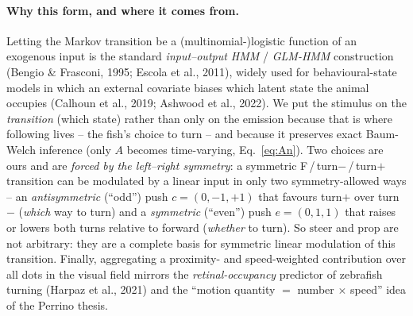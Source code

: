 \documentclass[11pt]{article}
\begin{document}
\paragraph{Why this form, and where it comes from.}
Letting the Markov transition be a (multinomial-)logistic function of an
exogenous input is the standard \emph{input--output HMM} / \emph{GLM-HMM}
construction (Bengio \& Frasconi, 1995; Escola et al., 2011), widely used for
behavioural-state models in which an external covariate biases which latent state
the animal occupies (Calhoun et al., 2019; Ashwood et al., 2022). We put the
stimulus on the \emph{transition} (which state) rather than only on the emission
because that is where following lives -- the fish's choice to turn -- and because
it preserves exact Baum-Welch inference (only $A$ becomes time-varying,
Eq.~\eqref{eq:An}). Two choices are ours and are \emph{forced by the left--right
symmetry}: a symmetric F\,/\,turn$-$\,/\,turn$+$ transition can be modulated by a
linear input in only two symmetry-allowed ways -- an \emph{antisymmetric}
(``odd'') push $c=(0,-1,+1)$ that favours turn$+$ over turn$-$ (\emph{which} way
to turn) and a \emph{symmetric} (``even'') push $e=(0,1,1)$ that raises or lowers
both turns relative to forward (\emph{whether} to turn). So $\text{steer}$ and
$\text{prop}$ are not arbitrary: they are a complete basis for symmetric linear
modulation of this transition. Finally, aggregating a proximity- and
speed-weighted contribution over all dots in the visual field mirrors the
\emph{retinal-occupancy} predictor of zebrafish turning (Harpaz et al., 2021) and
the ``motion quantity $=$ number $\times$ speed'' idea of the Perrino thesis.
\end{document}

